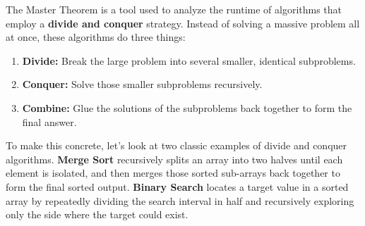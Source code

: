 \documentclass[11pt, a4paper]{article}
\begin{document}
The Master Theorem is a tool used to analyze the runtime of algorithms that employ a \textbf{divide and conquer} strategy. Instead of solving a massive problem all at once, these algorithms do three things:
\begin{enumerate}
    \item \textbf{Divide:} Break the large problem into several smaller, identical subproblems.
    \item \textbf{Conquer:} Solve those smaller subproblems recursively.
    \item \textbf{Combine:} Glue the solutions of the subproblems back together to form the final answer.
\end{enumerate}
To make this concrete, let's look at two classic examples of divide and conquer algorithms. \textbf{Merge Sort} recursively splits an array into two halves until each element is isolated, and then merges those sorted sub-arrays back together to form the final sorted output. \textbf{Binary Search} locates a target value in a sorted array by repeatedly dividing the search interval in half and recursively exploring only the side where the target could exist.
\end{document}

